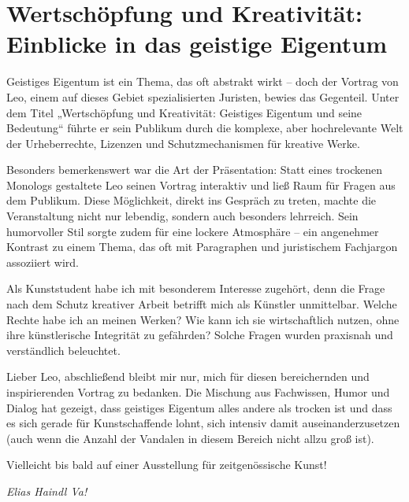 \section{Wertschöpfung und Kreativität: Einblicke in das geistige Eigentum}

\begin{multicols}{2}
Geistiges Eigentum ist ein Thema, das oft
abstrakt wirkt – doch der Vortrag von Leo, einem auf dieses Gebiet
spezialisierten Juristen, bewies das Gegenteil. Unter dem Titel „Wertschöpfung
und Kreativität: Geistiges Eigentum und seine Bedeutung“ führte er sein
Publikum durch die komplexe, aber hochrelevante Welt der Urheberrechte,
Lizenzen und Schutzmechanismen für kreative Werke.

Besonders bemerkenswert war die Art der
Präsentation: Statt eines trockenen Monologs gestaltete Leo seinen Vortrag
interaktiv und ließ Raum für Fragen aus dem Publikum. Diese Möglichkeit, direkt
ins Gespräch zu treten, machte die Veranstaltung nicht nur lebendig, sondern
auch besonders lehrreich. Sein humorvoller Stil sorgte zudem für eine lockere
Atmosphäre – ein angenehmer Kontrast zu einem Thema, das oft mit Paragraphen
und juristischem Fachjargon assoziiert wird.

Als Kunststudent habe ich mit besonderem
Interesse zugehört, denn die Frage nach dem Schutz kreativer Arbeit betrifft
mich als Künstler unmittelbar. Welche Rechte habe ich an meinen Werken? Wie
kann ich sie wirtschaftlich nutzen, ohne ihre künstlerische Integrität zu
gefährden? Solche Fragen wurden praxisnah und verständlich beleuchtet.

Lieber Leo, abschließend bleibt mir nur,
mich für diesen bereichernden und inspirierenden Vortrag zu bedanken. Die
Mischung aus Fachwissen, Humor und Dialog hat gezeigt, dass geistiges Eigentum
alles andere als trocken ist und dass es sich gerade für Kunstschaffende lohnt,
sich intensiv damit auseinanderzusetzen (auch wenn die Anzahl der Vandalen in diesem Bereich
nicht allzu groß ist).

Vielleicht bis bald auf einer Ausstellung für
zeitgenössische Kunst!
\end{multicols}

\begin{flushright}
		\hfill\emph{Elias Haindl Va!}
	\end{flushright}
			
